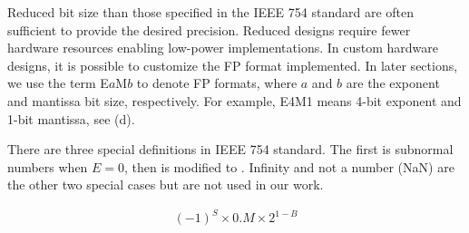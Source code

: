 Reduced bit size than those specified in the IEEE 754 standard are often sufficient to provide the desired precision. Reduced designs require fewer hardware resources enabling low-power implementations. In custom hardware designs, it is possible to customize the FP format implemented. In later sections, we use the term E$a$M$b$ to denote FP formats, where $a$ and $b$ are the exponent and mantissa bit size, respectively. For example, E4M1 means 4-bit exponent and 1-bit mantissa, see (d).

There are three special definitions in IEEE 754 standard. The first is subnormal numbers when $E=0$, then  is modified to . Infinity and not a number (NaN) are the other two special cases but are not used in our work.

\begin{eqnarray} \label{eq:float_subnorm}
(-1)^{S} \times 0.M \times 2^{1-B}
\end{eqnarray}